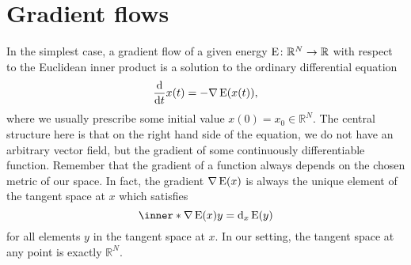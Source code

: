 \section{Gradient flows}
	\label{section_gradient_flows}
In the simplest case, a gradient flow of a given energy $ \operatorname{E} \colon 
\mathbb{ R }^{ N } \to \mathbb{ R } $ with respect to the Euclidean inner 
product is a solution to the ordinary differential equation
\begin{equation}
	\label{gf_basic_equation}
	\dv{ t } x ( t ) = - \nabla \operatorname{E} ( x ( t ) ) ,
\end{equation}
where we usually prescribe some initial value $ x ( 0 ) = x_{ 0 } \in \mathbb{ 
R }^{ N } $. The central structure here is that on the right hand side of the 
equation, we do not have an arbitrary vector field, but the gradient of some 
continuously 
differentiable function. Remember that the gradient of a function always 
depends on the chosen metric of our space. In fact, the gradient $ \nabla 
\operatorname{E} ( x ) $ is always the unique element of the tangent space at $ x $ 
which 
satisfies
\begin{equation*}
	\inner*{ \nabla \energy ( x ) }{ y }
	=
	\dd_{ x } \energy ( y ) 
\end{equation*}
for all elements $ y $ in the tangent space at $ x $. In our setting, the 
tangent space at any point is exactly $ \mathbb{ R }^{ N } $.  

